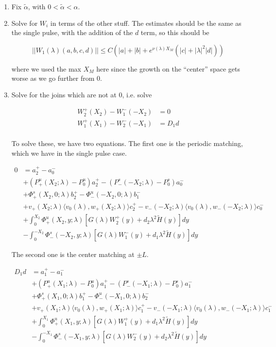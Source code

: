\documentclass[12pt]{article}
\begin{document}
\begin{enumerate}

\item Fix $\tilde{\alpha}$, with $0 < \tilde{\alpha} < \alpha$. 

\item Solve for $W_i$ in terms of the other stuff. The estimates should be the same as the single pulse, with the addition of the $d$ term, so this should be

\[
||W_1(\lambda)(a,b,c,d)|| \leq C (|a| + |b| + e^{\nu(\lambda)X_M}(|c| + |\lambda|^2 |d| ))
\]

where we used the max $X_M$ here since the growth on the ``center'' space gets worse as we go further from 0.

\item Solve for the joins which are not at 0, i.e. solve

\begin{align*}
W_2^+(X_2) - W_1^-(-X_2) &= 0 \\
W_1^+(X_1) - W_2^-(-X_1) &= D_1 d \\
\end{align*}

To solve these, we have two equations. The first one is the periodic matching, which we have in the single pulse case.

\begin{align*}
0 &= a_2^+ - a_0^- \\
&+ (P^u_+(X_2; \lambda) - P_0^u)a_2^+ - (P^s_-(-X_2; \lambda) - P_0^s)a_0^- \\
&+ \Phi^s_+(X_2, 0; \lambda)b_2^+ - \Phi^u_-(-X_2, 0; \lambda)b_1^- \\
&+ v_+(X_2; \lambda) \langle v_0(\lambda), w_+(X_2; \lambda) \rangle c_2^+ - v_-(-X_2; \lambda) \langle v_0(\lambda), w_-(-X_2; \lambda) \rangle c_0^- \\
&+ \int_0^{X_2} \Phi^u_+(X_2, y; \lambda) [ G(\lambda)W_2^+(y) + d_2 \lambda^2 \tilde{H}(y) ] dy \\
&- \int_0^{-X_2} \Phi^s_-(-X_2, y; \lambda) [ G(\lambda)W_1^-(y) + d_1 \lambda^2 \tilde{H}(y) ] dy
\end{align*}

The second one is the center matching at $\pm L$.

\begin{align*}
D_1 d &= a_1^+ - a_1^- \\
&+ (P^u_+(X_1; \lambda) - P_0^u)a_1^+ - (P^s_-(-X_1; \lambda) - P_0^s)a_1^- \\
&+ \Phi^s_+(X_1, 0; \lambda)b_1^+ - \Phi^u_-(-X_1, 0; \lambda)b_2^- \\
&+ v_+(X_1; \lambda) \langle v_0(\lambda), w_+(X_1; \lambda) \rangle c_1^+ - v_-(-X_1; \lambda) \langle v_0(\lambda), w_-(-X_1; \lambda) \rangle c_1^- \\
&+ \int_0^{X_1} \Phi^u_+(X_1, y; \lambda) [ G(\lambda)W_1^+(y) + d_1 \lambda^2 \tilde{H}(y) ] dy \\
&- \int_0^{-X_1} \Phi^s_-(-X_1, y; \lambda) [ G(\lambda)W_2^-(y) + d_2 \lambda^2 \tilde{H}(y) ] dy
\end{align*}


\end{enumerate}
\end{document}
